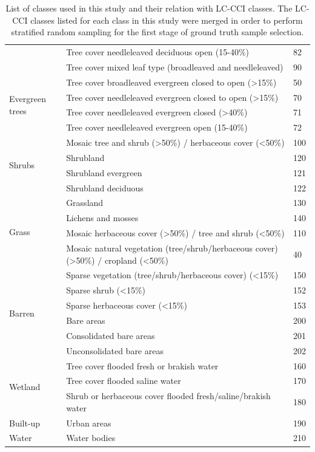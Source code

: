 \documentclass[a4paper,12pt]{scrbook}
\begin{document}
\begin{appendices}
\begin{table}[!ht]
\begin{center}
\begin{adjustbox}{totalheight=\baselineskip}
\begin{tabular}{lp{10.5cm}l}
	  & Tree cover  needleleaved  deciduous  open (15-40\%) & 82 \\
	  & Tree cover  mixed leaf type (broadleaved and needleleaved) & 90 \\
	\hline
	\multirow{4}{*}{Evergreen trees} & Tree cover broadleaved evergreen closed to open (>15\%) & 50 \\
	  & Tree cover  needleleaved  evergreen  closed to open (>15\%) & 70 \\
	  & Tree cover  needleleaved  evergreen  closed (>40\%) & 71 \\
	  & Tree cover  needleleaved  evergreen  open (15-40\%) & 72 \\
	\hline
	\multirow{4}{*}{Shrubs} & Mosaic tree and shrub (>50\%) / herbaceous cover (<50\%) & 100 \\
	  & Shrubland & 120 \\
	  & Shrubland evergreen & 121 \\
	  & Shrubland deciduous & 122 \\
	\hline
	\multirow{4}{*}{Grass} & Grassland & 130 \\
	  & Lichens and mosses & 140 \\
	  & Mosaic herbaceous cover (>50\%) / tree and shrub (<50\%) & 110 \\
	  & Mosaic natural vegetation (tree/shrub/herbaceous cover) (>50\%) / cropland (<50\%) & 40 \\
	\hline
	\multirow{6}{*}{Barren} & Sparse vegetation (tree/shrub/herbaceous cover) (<15\%) & 150 \\
	  & Sparse shrub (<15\%) & 152 \\
	  & Sparse herbaceous cover (<15\%) & 153 \\
	  & Bare areas & 200 \\
	  & Consolidated bare areas & 201 \\
	  & Unconsolidated bare areas & 202 \\
	\hline
	\multirow{3}{*}{Wetland} & Tree cover flooded fresh or brakish water & 160 \\
	  & Tree cover flooded saline water & 170 \\
	  & Shrub or herbaceous cover flooded fresh/saline/brakish water & 180 \\
	\hline
	Built-up & Urban areas & 190 \\
	\hline
	Water & Water bodies & 210 \\
	\hline
      \end{tabular}
    \end{adjustbox}
  \end{center}
  \caption{List of classes used in this study and their relation with LC-CCI classes. The LC-CCI classes listed for each class in this study were merged in order to perform stratified random sampling for the first stage of ground truth sample selection.}
  \label{tbl-classes}
 \end{table}
 

\end{appendices}
\end{document}
